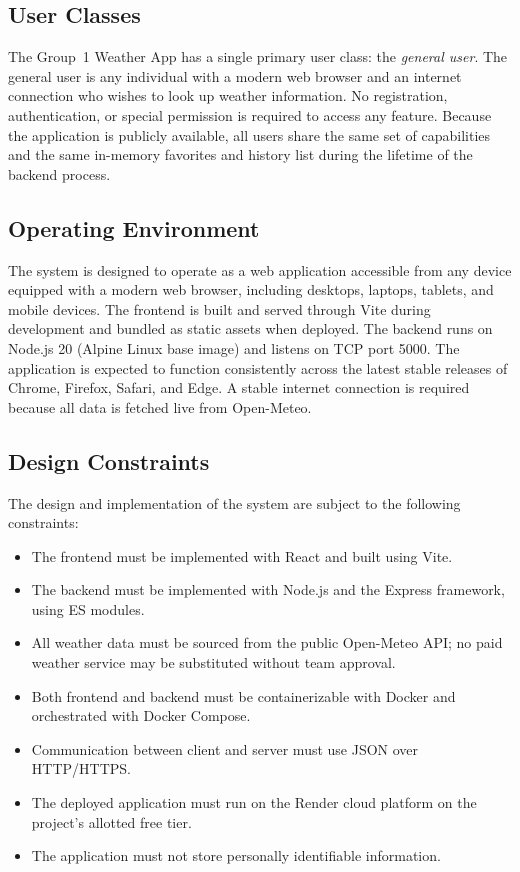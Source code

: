 \documentclass[11pt,letterpaper]{article}
\begin{document}
\subsection{User Classes}
The Group~1 Weather App has a single primary user class: the \emph{general user}. The general user is any individual with a modern web browser and an internet connection who wishes to look up weather information. No registration, authentication, or special permission is required to access any feature. Because the application is publicly available, all users share the same set of capabilities and the same in-memory favorites and history list during the lifetime of the backend process.

\subsection{Operating Environment}
The system is designed to operate as a web application accessible from any device equipped with a modern web browser, including desktops, laptops, tablets, and mobile devices. The frontend is built and served through Vite during development and bundled as static assets when deployed. The backend runs on Node.js 20 (Alpine Linux base image) and listens on TCP port 5000. The application is expected to function consistently across the latest stable releases of Chrome, Firefox, Safari, and Edge. A stable internet connection is required because all data is fetched live from Open-Meteo.

\subsection{Design Constraints}
The design and implementation of the system are subject to the following constraints:
\begin{itemize}
  \item The frontend must be implemented with React and built using Vite.
  \item The backend must be implemented with Node.js and the Express framework, using ES modules.
  \item All weather data must be sourced from the public Open-Meteo API; no paid weather service may be substituted without team approval.
  \item Both frontend and backend must be containerizable with Docker and orchestrated with Docker Compose.
  \item Communication between client and server must use JSON over HTTP/HTTPS.
  \item The deployed application must run on the Render cloud platform on the project's allotted free tier.
  \item The application must not store personally identifiable information.
\end{itemize}
\end{document}
